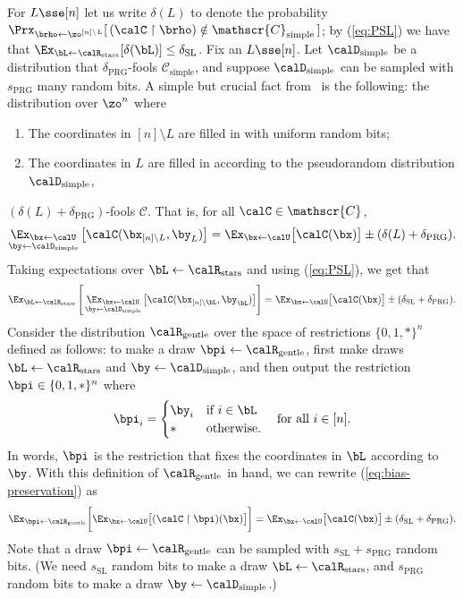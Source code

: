 \documentclass{toc}
\theoremstyle{plain}
\newcommand{\uhr}{\upharpoonright}
\newcommand{\simple}{\mathrm{simple}}
\newcommand{\stars}{\mathrm{stars}}
\newcommand{\gentle}{\mathrm{gentle}}
\newcommand{\PRG}{\mathrm{PRG}}
\newcommand{\SL}{\mathrm{SL}}
\begin{document}
For $L \sse [n]$ let us write $\delta(L)$ to denote the probability $\Prx_{\brho\leftarrow\zo^{[n]\setminus L}}[\, (\calC \uhr \brho) \notin \mathscr{C}_\simple\,]$; by (\ref{eq:PSL}) we have that $\Ex_{\bL\leftarrow\calR_\stars}[\delta(\bL)] \le \delta_\SL$. Fix an $L \sse [n]$. Let $\calD_\simple$ be a distribution that $\delta_\PRG$-fools $\mathscr{C}_\simple$, and suppose $\calD_\simple$ can be sampled with $s_\PRG$ many random bits. A simple but crucial fact from~\cite{AjtaiWigderson:85} is the following: the distribution over $\zo^n$ where 
\begin{enumerate}
\item The coordinates in $[n] \setminus L$ are filled in with uniform random bits;
\item The coordinates in $L$ are filled in according to the pseudorandom distribution $\calD_\simple$,
\end{enumerate}
$(\delta(L) + \delta_\PRG)$-fools $\mathscr{C}$. That is, for all $\calC \in \mathscr{C}$, 
\[ \mathop{\Ex_{\bx\leftarrow\calU}}_{\by\leftarrow\calD_\simple}\big[ \calC(\bx_{[n]\setminus L}, \by_L)\big] = \Ex_{\bx\leftarrow\calU}\big[\calC(\bx)\big] \pm (\delta(L) + \delta_\PRG). \] 
Taking expectations over $\bL \leftarrow\calR_\stars$ and using (\ref{eq:PSL}), we get that 
\begin{equation} \Ex_{\bL\leftarrow\calR_\stars}\left[\,\mathop{\Ex_{\bx\leftarrow\calU}}_{\by\leftarrow\calD_\simple}\big[ \calC(\bx_{[n]\setminus \bL}, \by_{\bL})\big]\right] = \Ex_{\bx\leftarrow\calU}\big[\calC(\bx)\big] \pm (\delta_\SL + \delta_\PRG). \label{eq:bias-preservation}
\end{equation} 
Consider the distribution $\calR_\gentle$ over the space of restrictions $\{0,1,\ast\}^n$ defined as follows: to make a draw $\bpi \leftarrow\calR_\gentle$, first make draws $\bL \leftarrow\calR_\stars$ and $\by \leftarrow\calD_\simple$, and then output the restriction $\bpi \in \{0,1,\ast\}^n$ where 
\[ 
\bpi_i = \begin{cases}
\by_i & \text{if $i \in \bL$} \\
\ast & \text{otherwise.}  
\end{cases} \quad \text{for all $i\in [n]$.}
\] 
In words, $\bpi$ is the restriction that fixes the coordinates in $\bL$ according to $\by$. With this definition of $\calR_\gentle$ in hand, we can rewrite (\ref{eq:bias-preservation}) as 
\begin{equation}
\Ex_{\bpi\leftarrow\calR_\gentle} \bigg[ \Ex_{\bx\leftarrow\calU}\big[(\calC\uhr\bpi)(\bx)\big]\bigg] =  \Ex_{\bx\leftarrow\calU}\big[\calC(\bx)\big] \pm (\delta_\SL + \delta_\PRG). 
\label{eq:bias-preservation2} 
\end{equation}
Note that a draw $\bpi \leftarrow \calR_\gentle$ can be sampled with $s_\SL + s_\PRG$ random bits. (We need $s_\SL$ random bits to make a draw $\bL \leftarrow \calR_\stars$, and $s_\PRG$ random bits to make a draw $\by\leftarrow\calD_\simple$.)
\end{document}
